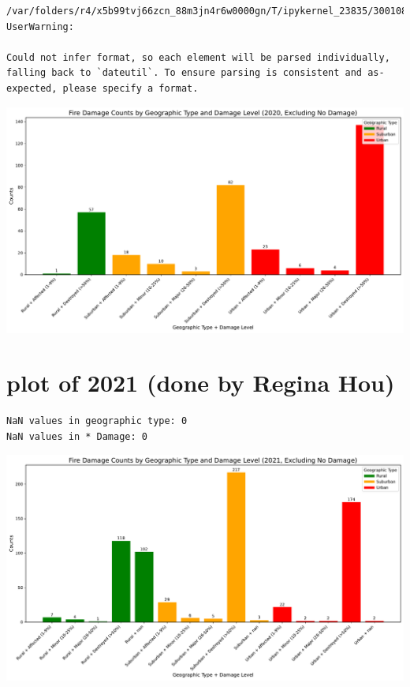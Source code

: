 \documentclass[
  letterpaper,
  DIV=11,
  numbers=noendperiod]{scrartcl}
\begin{document}
\begin{verbatim}
/var/folders/r4/x5b99tvj66zcn_88m3jn4r6w0000gn/T/ipykernel_23835/3001088990.py:3: UserWarning:

Could not infer format, so each element will be parsed individually, falling back to `dateutil`. To ensure parsing is consistent and as-expected, please specify a format.
\end{verbatim}

\includegraphics{Final Writeup_files/figure-pdf/cell-12-output-2.pdf}

\section{plot of 2021 (done by Regina
Hou)}\label{plot-of-2021-done-by-regina-hou}

\begin{verbatim}
NaN values in geographic type: 0
NaN values in * Damage: 0
\end{verbatim}

\includegraphics{Final Writeup_files/figure-pdf/cell-14-output-1.pdf}
\end{document}
